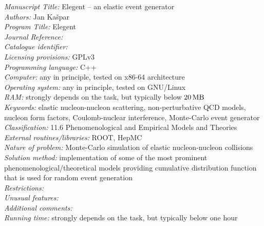 \documentclass[preprint,12pt]{elsarticle}
\def\un#1{{\,\rm #1}}
\begin{document}
\begin{small}
\noindent
{\em Manuscript Title:} Elegent -- an elastic event generator\\
{\em Authors:} Jan Ka\v spar\\
{\em Program Title:} Elegent\\
{\em Journal Reference:}\\ %
{\em Catalogue identifier:}\\ %
{\em Licensing provisions:} GPLv3\\ %
{\em Programming language:} C++\\
{\em Computer:} any in principle, tested on x86-64 architecture\\
{\em Operating system:} any in principle, tested on GNU/Linux\\
{\em RAM:} strongly depends on the task, but typically below $20\un{MB}$\\ %
{\em Keywords:} elastic nucleon-nucleon scattering, non-perturbative QCD models, nucleon form factors, Coulomb-nuclear interference, Monte-Carlo event generator\\ %
{\em Classification:} 11.6 Phenomenological and Empirical Models and Theories\\ %
{\em External routines/libraries:} ROOT, HepMC\\ %
{\em Nature of problem:} Monte-Carlo simulation of elastic nucleon-nucleon collisions\\%
{\em Solution method:} implementation of some of the most prominent phenomenological/theoretical models providing cumulative distribution function that is used for random event generation\\ %
{\em Restrictions:}\\ %
{\em Unusual features:}\\ %
{\em Additional comments:}\\ %
{\em Running time:} strongly depends on the task, but typically below one hour\\ %
\end{small}
\end{document}
